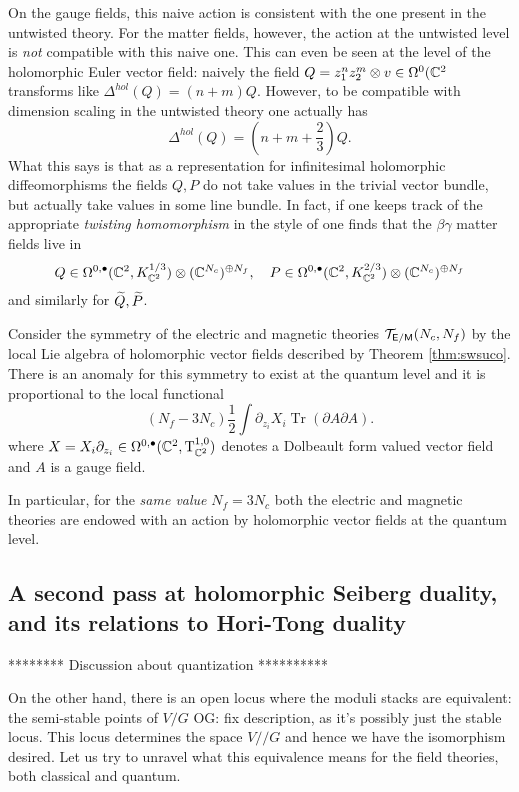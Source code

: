 \documentclass[11pt]{amsart}
\renewcommand{\op}{\operatorname}
\def\owen#1{{\textcolor{violet!65!black}{OG: {#1}}}}
\begin{document}
On the gauge fields, this naive action is consistent with the one present in the untwisted theory. 
For the matter fields, however, the action at the untwisted level is {\em not} compatible with this naive one. 
This can even be seen at the level of the holomorphic Euler vector field: naively the field $Q = z_1^n z_2^m \otimes v \in \Omega^0 (\CC^2$ transforms like $\Delta^{hol}(Q) = (n+m) Q$.
However, to be compatible with dimension scaling in the untwisted theory one actually has 
\[
\Delta^{hol}(Q) = \left(n + m + \frac23\right) Q .
\]
What this says is that as a representation for infinitesimal holomorphic diffeomorphisms the fields $Q, P$ do not take values in the trivial vector bundle, but actually take values in some line bundle.  
In fact, if one keeps track of the appropriate {\em twisting homomorphism} in the style of \cite{WittenTwist} one finds that the $\beta\gamma$ matter fields live in
\[
Q \in \Omega^{0,\bu}(\CC^2 , K_{\CC^2}^{1/3}) \otimes (\CC^{N_c})^{\oplus N_f} , \quad P \in \Omega^{0,\bu}(\CC^2 , K_{\CC^2}^{2/3}) \otimes (\CC^{N_c})^{\oplus N_f}
\]
and similarly for $\Tilde{Q}, \Tilde{P}$. 

\begin{prop}
Consider the symmetry of the electric and magnetic theories $\cT_{\sfE / \sfM}(N_c,N_f)$ by the local Lie algebra of holomorphic vector fields described by Theorem \ref{thm:swsuco}. 
There is an anomaly for this symmetry to exist at the quantum level and it is proportional to the local functional
\[
\left(N_f - 3N_c\right) \frac12 \int \partial_{z_i} X_i \op{Tr} (\partial A \partial A)  .
\]
where $X = X_i \partial_{z_i} \in \Omega^{0,\bu}(\CC^2, \T_{\CC^2}^{1,0})$ denotes a Dolbeault form valued vector field and $A$ is a gauge field.
\end{prop}

In particular, for the {\em same value} $N_f = 3 N_c$ both the electric and magnetic theories are endowed with an action by holomorphic vector fields at the quantum level. 

\subsection{A second pass at holomorphic Seiberg duality, and its relations to Hori-Tong duality}

******** Discussion about quantization **********


On the other hand, there is an open locus where the moduli stacks are equivalent:
the semi-stable points of $V/G$ \owen{fix description, as it's possibly just the stable locus}.
This locus determines the space $V//G$ and hence we have the isomorphism desired.
Let us try to unravel what this equivalence means for the field theories, both classical and quantum.
\end{document}
